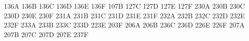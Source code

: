 \newsymbol{}
\newsymbol{}
\newsymbol{}
\newsymbol{}
\newsymbol{}
 \let\doublecup\Cup
\newsymbol{}
 \let\doublecap\Cap
\newsymbol{}
\newsymbol{}
\newsymbol{}
\newsymbol{}
\newsymbol\subseteqq 136A
\newsymbol\supseteqq 136B
\newsymbol\bumpeq 136C
\newsymbol\Bumpeq 136D
\newsymbol\lll 136E
 \let\llless\lll
\newsymbol\ggg 136F
 \let\gggtr\ggg
\newsymbol{}
\newsymbol{}
\newsymbol{}
\newsymbol{}
\newsymbol{}
\newsymbol\complement 107B
\newsymbol\intercal 127C
\newsymbol\circledcirc 127D
\newsymbol\circledast 127E
\newsymbol\circleddash 127F
\newsymbol{}
\newsymbol{}
\newsymbol{}
\newsymbol{}
\newsymbol{}
\newsymbol{}
\newsymbol{}
\newsymbol{}
\newsymbol{}
\newsymbol{}
\newsymbol\nleqslant 230A
\newsymbol\ngeqslant 230B
\newsymbol\lneq 230C
\newsymbol\gneq 230D
\newsymbol\npreceq 230E
\newsymbol\nsucceq 230F
\newsymbol{}
\newsymbol{}
\newsymbol{}
\newsymbol{}
\newsymbol{}
\newsymbol{}
\newsymbol{}
\newsymbol{}
\newsymbol{}
\newsymbol{}
\newsymbol\lnapprox 231A
\newsymbol\gnapprox 231B
\newsymbol\nsim 231C
\newsymbol\ncong 231D
\newsymbol\diagup 231E
\newsymbol\diagdown 231F
\newsymbol{}
\newsymbol{}
\newsymbol{}
\newsymbol{}
\newsymbol{}
\newsymbol{}
\newsymbol{}
\newsymbol{}
\newsymbol{}
\newsymbol{}
\newsymbol\nsubseteq 232A
\newsymbol\nsupseteq 232B
\newsymbol\nparallel 232C
\newsymbol\nmid 232D
\newsymbol\nshortmid 232E
\newsymbol\nshortparallel 232F
\newsymbol{}
\newsymbol{}
\newsymbol{}
\newsymbol{}
\newsymbol{}
\newsymbol{}
\newsymbol{}
\newsymbol{}
\newsymbol{}
\newsymbol{}
\newsymbol\nLeftarrow 233A
\newsymbol\nRightarrow 233B
\newsymbol\nLeftrightarrow 233C
\newsymbol\nleftrightarrow 233D
\newsymbol\divideontimes 223E
\newsymbol\varnothing 203F
\newsymbol{}
\newsymbol{}
\newsymbol{}
\newsymbol{}
\newsymbol{}
\newsymbol{}
\newsymbol{}
\newsymbol\gimel 206A
\newsymbol\daleth 206B
\newsymbol\lessdot 236C
\newsymbol\gtrdot 236D
\newsymbol\ltimes 226E
\newsymbol\rtimes 226F
\newsymbol{}
\newsymbol{}
\newsymbol{}
\newsymbol{}
\newsymbol{}
\newsymbol{}
\newsymbol{}
\newsymbol{}
\newsymbol{}
\newsymbol{}
\newsymbol\digamma 207A
\newsymbol\varkappa 207B
\newsymbol\Bbbk 207C
\newsymbol\hslash 207D
\undefine\hbar
\newsymbol\hbar 207E
\newsymbol\backepsilon 237F


\let\undefine\normalundefine
\let\newsymbol\normalnewsymbol

\protect %

\endinput
